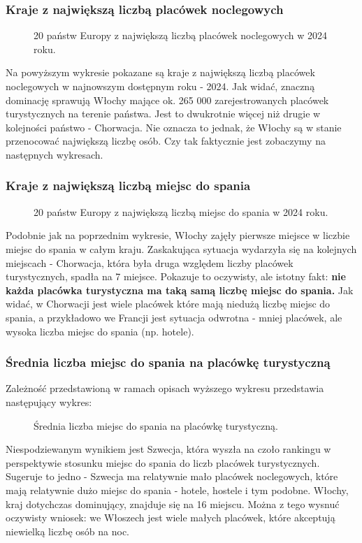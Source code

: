 \documentclass[12pt]{article}
\begin{document}
\subsubsection{Kraje z największą liczbą placówek noclegowych}
\begin{figure}[H]
    
    \caption{20 państw Europy z największą liczbą placówek noclegowych w 2024 roku.}
\end{figure}
Na powyższym wykresie pokazane są kraje z największą liczbą placówek noclegowych w najnowszym dostępnym roku - 2024.
Jak widać, znaczną dominację sprawują Włochy mające ok. 265 000 zarejestrowanych placówek turystycznych na terenie państwa.
Jest to dwukrotnie więcej niż drugie w kolejności państwo - Chorwacja. Nie oznacza to jednak, że Włochy są w stanie
przenocować największą liczbę osób. Czy tak faktycznie jest zobaczymy na następnych wykresach.


\subsubsection{Kraje z największą liczbą miejsc do spania}
\begin{figure}[H]
    
    \caption{20 państw Europy z największą liczbą miejsc do spania w 2024 roku.}
\end{figure}
Podobnie jak na poprzednim wykresie, Włochy zajęły pierwsze miejsce w liczbie miejsc do spania w całym kraju.
Zaskakująca sytuacja wydarzyła się na kolejnych miejscach - Chorwacja, która była druga względem liczby placówek turystycznych,
spadła na 7 miejsce. Pokazuje to oczywisty, ale istotny fakt: \textbf{nie każda placówka turystyczna ma taką samą liczbę 
miejsc do spania.} Jak widać, w Chorwacji jest wiele placówek które mają niedużą liczbę miejsc do spania, 
a przykładowo we Francji jest sytuacja odwrotna - mniej placówek, ale wysoka liczba miejsc do spania (np. hotele).


\subsubsection{Średnia liczba miejsc do spania na placówkę turystyczną}
Zależność przedstawioną w ramach opisach wyższego wykresu przedstawia następujący wykres:
\begin{figure}[H]
    
    \caption{Średnia liczba miejsc do spania na placówkę turystyczną.}
\end{figure}
Niespodziewanym wynikiem jest Szwecja, która wyszła na czoło rankingu w perspektywie stosunku miejsc do spania 
do liczb placówek turystycznych. Sugeruje to jedno - Szwecja ma relatywnie mało placówek noclegowych, które mają relatywnie 
dużo miejsc do spania - hotele, hostele i tym podobne.
Włochy, kraj dotychczas dominujący, znajduje się na 16 miejscu. Można z tego wysnuć oczywisty wniosek: 
we Włoszech jest wiele małych placówek, które akceptują niewielką liczbę osób na noc.
\end{document}
